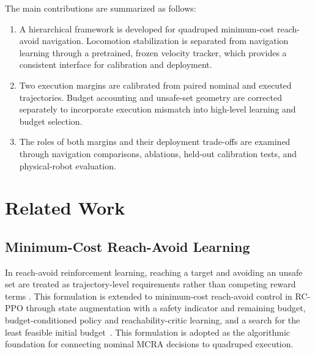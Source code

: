 \documentclass[conference]{IEEEtran}
\begin{document}
The main contributions are summarized as follows:
\begin{enumerate}
\item A hierarchical framework is developed for quadruped minimum-cost reach-avoid
      navigation. Locomotion stabilization is separated from navigation learning
      through a pretrained, frozen velocity tracker, which provides a consistent
      interface for calibration and deployment.
\item Two execution margins are calibrated from paired nominal and executed
      trajectories. Budget accounting and unsafe-set geometry are corrected
      separately to incorporate execution mismatch into high-level learning and
      budget selection.
\item The roles of both margins and their deployment trade-offs are examined
      through navigation comparisons, ablations, held-out calibration tests, and
      physical-robot evaluation.
\end{enumerate}

\section{Related Work}
\subsection{Minimum-Cost Reach-Avoid Learning}
In reach-avoid reinforcement learning, reaching a target and avoiding an unsafe
set are treated as trajectory-level requirements rather than competing reward terms
\cite{bansal2017,hsu2021}. This formulation is extended to minimum-cost
reach-avoid control in RC-PPO through state augmentation with a safety indicator
and remaining budget, budget-conditioned policy and reachability-critic learning,
and a search for the least feasible initial budget~\cite{so2024}. This formulation
is adopted as the algorithmic foundation for connecting nominal MCRA decisions
to quadruped execution.
\end{document}
